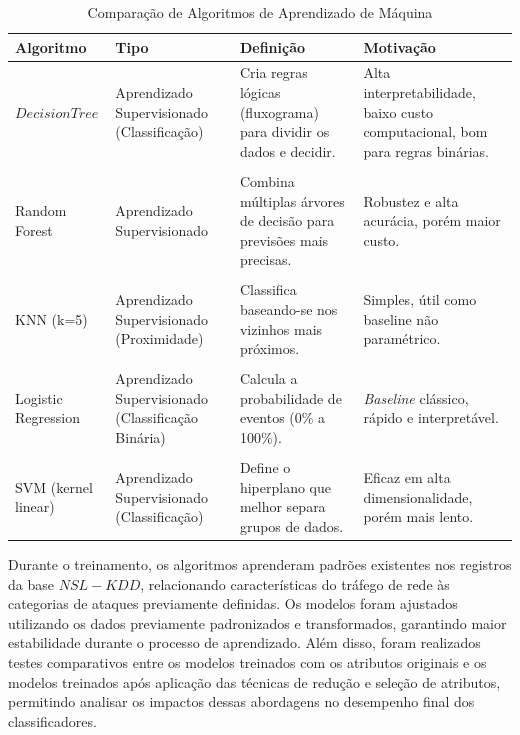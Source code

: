 \documentclass[a4paper,10pt, twocolumn]{article}
\begin{document}
\begin{table}[H]
\centering
\footnotesize
\renewcommand{\arraystretch}{0.9}
\setlength{\tabcolsep}{2pt}

\begin{tabularx}{\linewidth}{
>{\hsize=0.45\hsize}X
>{\hsize=0.3\hsize}X
>{\hsize=0.3\hsize}X
>{\hsize=0.3\hsize}X
}
\toprule
\textbf{Algoritmo} & 
\textbf{Tipo} \cite{IBM2026Supervised} & 
\textbf{Definição} \cite{IBM2026Supervised} & 
\textbf{Motivação} \\
\midrule

$Decision Tree$ & 
Aprendizado Supervisionado (Classificação) & 
Cria regras lógicas (fluxograma) para dividir os dados e decidir. & 
Alta interpretabilidade, baixo custo computacional, bom para regras binárias. \\
\\

Random Forest & 
Aprendizado Supervisionado  & 
Combina múltiplas árvores de decisão para previsões mais precisas. & 
Robustez e alta acurácia, porém maior custo. \\
\\

KNN (k=5) & 
Aprendizado Supervisionado (Proximidade) & 
Classifica baseando-se nos vizinhos mais próximos. & 
Simples, útil como baseline não paramétrico. \\
\\

Logistic Regression & 
Aprendizado Supervisionado (Classificação Binária) & 
Calcula a probabilidade de eventos (0\% a 100\%). & 
\textit{Baseline} clássico, rápido e interpretável. \\
\\

SVM (kernel linear) & 
Aprendizado Supervisionado (Classificação) & 
Define o hiperplano que melhor separa grupos de dados. & 
Eficaz em alta dimensionalidade, porém mais lento. \\

\bottomrule
\end{tabularx}

\caption{Comparação de Algoritmos de Aprendizado de Máquina}
\end{table}

Durante o treinamento, os algoritmos aprenderam padrões existentes nos registros 
da base $NSL-KDD$, relacionando características do tráfego de rede às categorias 
de ataques previamente definidas. Os modelos foram ajustados utilizando os dados 
previamente padronizados e transformados, garantindo maior estabilidade durante 
o processo de aprendizado. Além disso, foram realizados testes comparativos 
entre os modelos treinados com os atributos originais e os modelos treinados 
após aplicação das técnicas de redução e seleção de atributos, permitindo analisar 
os impactos dessas abordagens no desempenho final dos classificadores.
\end{document}
